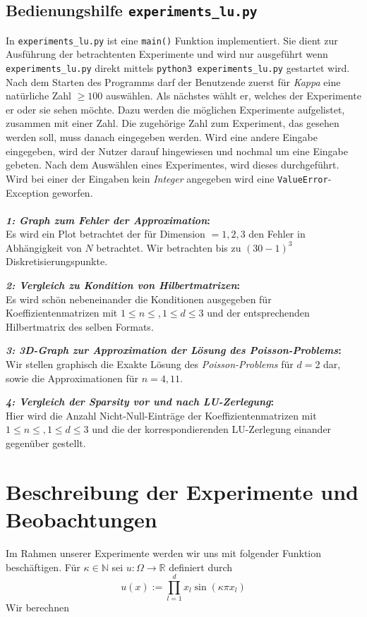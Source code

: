 \documentclass[smallheadings]{scrartcl}
\theoremstyle{definition}
\newcommand{\bfpara}[1]{
	
	\noindent \textbf{#1:}\,}
\begin{document}
\subsection{Bedienungshilfe \texttt{experiments\_lu.py}}
In \texttt{experiments\_lu.py} ist eine \texttt{main()} Funktion implementiert. Sie dient zur Ausf\"uhrung der 
		betrachtenten Experimente und
		wird nur ausgef\"uhrt wenn \texttt{experiments\_lu.py} direkt mittels \texttt{python3 experiments\_lu.py} gestartet wird. 
		Nach dem Starten des Programms darf der Benutzende zuerst für \textit{Kappa} eine natürliche Zahl $\geq 100$ ausw\"ahlen. Als nächstes wählt er, welches der Experimente er oder sie sehen möchte. Dazu werden die möglichen Experimente aufgelistet, zusammen mit einer Zahl. Die zugehörige Zahl zum Experiment, das gesehen werden soll, muss danach eingegeben werden. Wird eine andere Eingabe eingegeben, wird der Nutzer darauf hingewiesen und nochmal um eine Eingabe gebeten. Nach dem Auswählen eines Experimentes, wird dieses durchgeführt.
Wird bei einer der Eingaben kein \textit{Integer} angegeben wird eine \texttt{ValueError}-Exception geworfen.\\
\\

\bfpara{\textit{1: Graph zum Fehler der Approximation}}\\
Es wird ein Plot betrachtet der für Dimension $=1,2,3$ den Fehler in Abhängigkeit von $N$ betrachtet. Wir betrachten bis zu $(30-1)^3$ Diskretisierungspunkte.
\bfpara{\textit{2: Vergleich zu Kondition von Hilbertmatrizen}}\\
Es wird schön nebeneinander die Konditionen ausgegeben für Koeffizientenmatrizen mit $1 \leq n \leq  ,1\leq d \leq 3$ und der entsprechenden Hilbertmatrix des selben Formats.
\bfpara{\textit{3: 3D-Graph zur Approximation der Lösung des Poisson-Problems}}\\
Wir stellen graphisch die Exakte Lösung des \textit{Poisson-Problems} für $d=2$ dar, sowie die Approximationen für $n=4,11$.

\bfpara{\textit{4: Vergleich der Sparsity vor und nach LU-Zerlegung}}\\
Hier wird die Anzahl Nicht-Null-Einträge der Koeffizientenmatrizen mit $1 \leq n \leq  ,1\leq d \leq 3$ und die der korrespondierenden LU-Zerlegung einander gegenüber gestellt.
		

\section{Beschreibung der Experimente und Beobachtungen}
Im Rahmen unserer Experimente werden wir uns mit folgender Funktion beschäftigen.
Für $\kappa \in \mathbb{N}$ sei $u:\Omega\rightarrow \mathbb{R}$ definiert durch
$$u(x):=\prod_{l=1}^dx_l\sin (\kappa\pi x_l)$$
Wir berechnen
\end{document}
